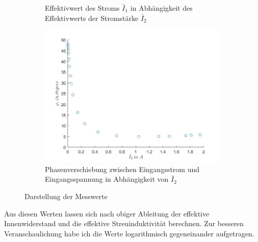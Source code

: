 \documentclass[a4paper, 12pt,]{scrartcl}
\begin{document}
\begin{figure}[H]
\begin{adjustwidth}{-1em}{7em}
\begin{subfigure}[b]{0.5\textwidth}
    \caption{Effektivwert des Stroms $\bar{I}_1$ in Abhängigkeit des  Effektivwerts der Stromstärke $\bar{I}_2$}
    \label{fig:}
  \end{subfigure}
\end{adjustwidth}\centering
\begin{adjustwidth}{-1em}{7em}
  \begin{subfigure}[b]{0.5\textwidth}
    \includegraphics[width=\textwidth]{I2phi12}
    \caption{Phasenverschiebung zwischen Eingangsstrom und Eingangsspannung in Abhängigkeit von $\bar{I}_2$}
    \label{fig:}
  \end{subfigure} 
\end{adjustwidth}
\caption{Darstellung der Messwerte}
\end{figure}
Aus diesen Werten lassen sich nach obiger Ableitung der effektive Innenwiderstand und die effektive Streuinduktivität berechnen. Zur besseren Veranschaulichung habe ich die Werte logarithmisch gegeneinander aufgetragen.
\end{document}
